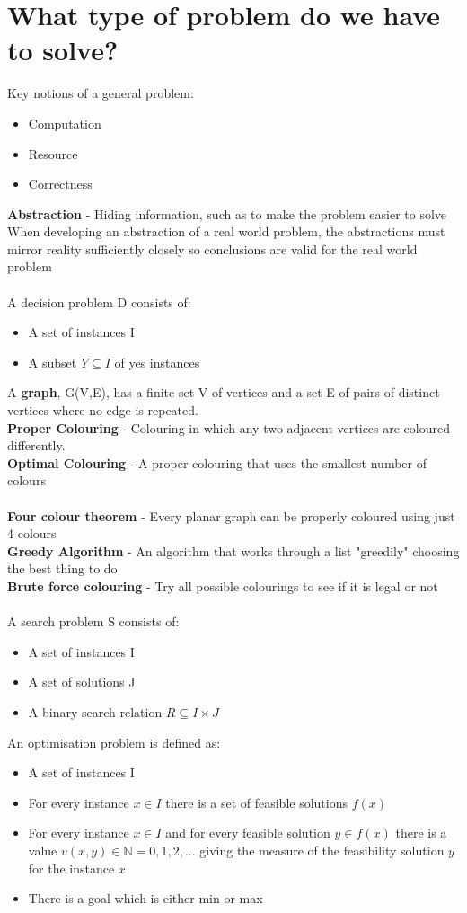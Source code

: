 \documentclass{article}[18pt]
\begin{document}
\section{What type of problem do we have to solve?}
Key notions of a general problem:
\begin{itemize}
	\item Computation
	\item Resource
	\item Correctness
\end{itemize}
\textbf{Abstraction} - Hiding information, such as to make the problem easier to solve\\
When developing an abstraction of a real world problem, the abstractions must mirror reality sufficiently closely so conclusions are valid for the real world problem\\
\\
A decision problem D consists of:
\begin{itemize}
	\item A set of instances I
	\item A subset $Y\subseteq I$ of yes instances 
\end{itemize}
A \textbf{graph}, G(V,E), has a finite set V of vertices and a set E of pairs of distinct vertices where no edge is repeated.\\
\textbf{Proper Colouring} - Colouring in which any two adjacent vertices are coloured differently.\\
\textbf{Optimal Colouring} - A proper colouring that uses the smallest number of colours\\
\\
\textbf{Four colour theorem} - Every planar graph can be properly coloured using just 4 colours\\
\textbf{Greedy Algorithm} - An algorithm that works through a list "greedily" choosing the best thing to do\\
\textbf{Brute force colouring} - Try all possible colourings to see if it is legal or not\\
\\
A search problem S consists of:
\begin{itemize}
	\item A set of instances I
	\item A set of solutions J
	\item A binary search relation $R\subseteq I\times J$
\end{itemize}
An optimisation problem is defined as:
\begin{itemize}
	\item A set of instances I
	\item For every instance $x\in I$ there is a set of feasible solutions $f(x)$
	\item For every instance $x\in I$ and for every feasible solution $y\in f(x)$ there is a value $v(x,y)\in \mathbb{N}={0,1,2,...}$ giving the measure of the feasibility solution $y$ for the instance $x$
	\item There is a goal which is either min or max
\end{itemize}
\end{document}
